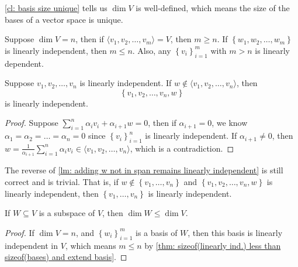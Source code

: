 \begin{remark}
    \autoref{cl: basis size unique} tells us \(\dim V\) is well-defined, which means the size of the bases of a vector space is unique.  
\end{remark}

\begin{corollary}
    Suppose \(\dim V = n\), then if \(\langle v_1, v_2, \dots , v_m \rangle = V \), then \(m \ge n\). If \(\left\{ w_1, w_2, \dots , w_m \right\} \) is linearly independent, then \(m \le n\). Also, any \(\left\{ v_i \right\}_{i=1}^m \) with \(m > n\) is linearly dependent.  
\end{corollary}

\begin{lemma} \label{lm: adding w not in span remains linearly independent}
    Suppose \(v_1, v_2, \dots , v_n\) is linearly independent. If \(w \notin \langle v_1, v_2, \dots , v_n \rangle \), then 
    \[
        \left\{ v_1, v_2, \dots , v_n, w \right\} 
    \] is linearly independent.
\end{lemma}
\begin{proof}
    Suppose \(\sum_{i=1}^n \alpha _i v_i + \alpha _{i+1} w = 0\), then if \(\alpha _{i+1} = 0\), we know \(\alpha _1 = \alpha _2 =\dots = \alpha _n = 0\) since \(\left\{ v_i \right\}_{i=1}^n \) is linearly independent. If \(\alpha _{i+1} \neq 0\), then \(w = \frac{1}{\alpha _{i+1}} \sum_{i=1}^n \alpha _i v_i \in \langle v_1, v_2, \dots , v_n \rangle  \), which is a contradiction.      
\end{proof}

\begin{note}
    The reverse of \autoref{lm: adding w not in span remains linearly independent} is still correct and is trivial. That is, if \(w \notin \left\{ v_1, \dots , v_n \right\} \) and \(\left\{ v_1, v_2, \dots , v_n, w \right\} \) is linearly independent, then \(\left\{ v_1, \dots , v_n \right\} \) is linearly independent.    
\end{note}

\begin{corollary}
    If \(W \subseteq V\) is a subspace of \(V\), then \(\dim W \le \dim V\).   
\end{corollary}
\begin{proof}
    If \(\dim V = n\), and \(\left\{ w_i \right\}_{i=1}^m \) is a basis of \(W\), then this basis is linearly independent in \(V\), which means \(m \le n\) by \autoref{thm: sizeof(linearly ind.) less than sizeof(bases) and extend basis}.       
\end{proof}

